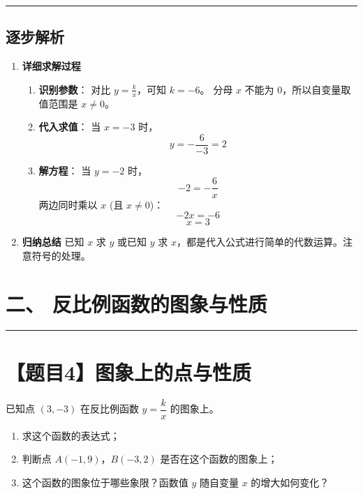 \documentclass[UTF8]{ctexart}
\newenvironment{redenv}{\color{red}}{}
\newenvironment{detailedanalysis}{%
    \color{red}
    \begin{enumerate}[label=\textbf{第\arabic*步：}, leftmargin=*, align=left, itemsep=1.5ex]
}{%
    \end{enumerate}
}
\newcommand{\problemrule}{\noindent\rule{\textwidth}{1.5pt}\vspace{-0.8em}}
\newcommand{\analysisrule}{\noindent\rule{\textwidth}{0.8pt}\vspace{-0.8em}}
\begin{document}
\begin{redenv}
\analysisrule
\subsection*{逐步解析}

\begin{detailedanalysis}
\item \textbf{详细求解过程}
\begin{enumerate}[label=(\arabic*)]
    \item \textbf{识别参数}：
    对比 $y = \frac{k}{x}$，可知 $k=-6$。
    分母 $x$ 不能为 0，所以自变量取值范围是 $x \neq 0$。
    
    \item \textbf{代入求值}：
    当 $x = -3$ 时，
    \[ y = -\frac{6}{-3} = 2 \]
    
    \item \textbf{解方程}：
    当 $y = -2$ 时，
    \[ -2 = -\frac{6}{x} \]
    两边同时乘以 $x$ (且 $x \neq 0$)：
    \[ -2x = -6 \]
    \[ x = 3 \]
\end{enumerate}

\item \textbf{归纳总结}
已知 $x$ 求 $y$ 或已知 $y$ 求 $x$，都是代入公式进行简单的代数运算。注意符号的处理。
\end{detailedanalysis}
\end{redenv}

\newpage
\section*{二、 反比例函数的图象与性质}

\problemrule
\section*{【题目4】图象上的点与性质}
已知点 $(3, -3)$ 在反比例函数 $y = \dfrac{k}{x}$ 的图象上。
\begin{enumerate}[label=(\arabic*), itemsep=5pt]
    \item 求这个函数的表达式；
    \item 判断点 $A(-1, 9)$，$B(-3, 2)$ 是否在这个函数的图象上；
    \item 这个函数的图象位于哪些象限？函数值 $y$ 随自变量 $x$ 的增大如何变化？
\end{enumerate}
\end{document}
